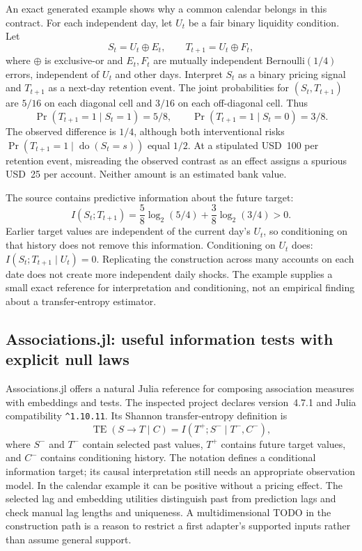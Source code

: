 An exact generated example shows why a common calendar belongs in this
contract. For each independent day, let $U_t$ be a fair binary liquidity
condition. Let
\[
 S_t=U_t\mathbin{\oplus}E_t,\qquad
 T_{t+1}=U_t\mathbin{\oplus}F_t,
\]
where $\oplus$ is exclusive-or and $E_t,F_t$ are mutually independent
Bernoulli$(1/4)$ errors, independent of $U_t$ and other days. Interpret $S_t$
as a binary pricing signal and $T_{t+1}$ as a next-day retention event.
The joint probabilities for $(S_t,T_{t+1})$ are $5/16$ on each diagonal
cell and $3/16$ on each off-diagonal cell. Thus
\[
 \Pr(T_{t+1}=1\mid S_t=1)=5/8,\qquad
 \Pr(T_{t+1}=1\mid S_t=0)=3/8.
\]
The observed difference is $1/4$, although both interventional risks
$\Pr(T_{t+1}=1\mid\operatorname{do}(S_t=s))$ equal $1/2$.
At a stipulated USD~100 per retention event, misreading the observed contrast
as an effect assigns a spurious USD~25 per account. Neither amount is an
estimated bank value.
\citep{exec17_temporal_oracle}

The source contains predictive information about the future target:
\[
 I(S_t;T_{t+1})=
 \frac58\log_2(5/4)+\frac38\log_2(3/4)>0.
\]
Earlier target values are independent of the current day's $U_t$, so
conditioning on that history does not remove this information. Conditioning
on $U_t$ does: $I(S_t;T_{t+1}\mid U_t)=0$. Replicating the construction across
many accounts on each date does not create more independent daily shocks.
The example supplies a small exact reference for interpretation and
conditioning, not an empirical finding about a transfer-entropy estimator.
\citep{exec17_temporal_oracle}

\subsection{Associations.jl: useful information tests with explicit null laws}

Associations.jl offers a natural Julia reference for composing association
measures with embeddings and tests. The inspected project declares
version~4.7.1 and Julia compatibility \texttt{\^{}1.10.11}. Its Shannon
transfer-entropy definition is
\[
 \operatorname{TE}(S\to T\mid C)
       =I(T^+;S^-\mid T^-,C^-),
\]
where $S^-$ and $T^-$ contain selected past values, $T^+$ contains future
target values, and $C^-$ contains conditioning history. The notation defines
a conditional information target; its causal interpretation still needs an
appropriate observation model. In the calendar example it can be positive
without a pricing effect. The selected lag and embedding utilities distinguish
past from prediction lags and check manual lag lengths and uniqueness.
A multidimensional TODO in the construction path is a reason to restrict a
first adapter's supported inputs rather than assume general support.
\citep{exec17_temporal_associations}

